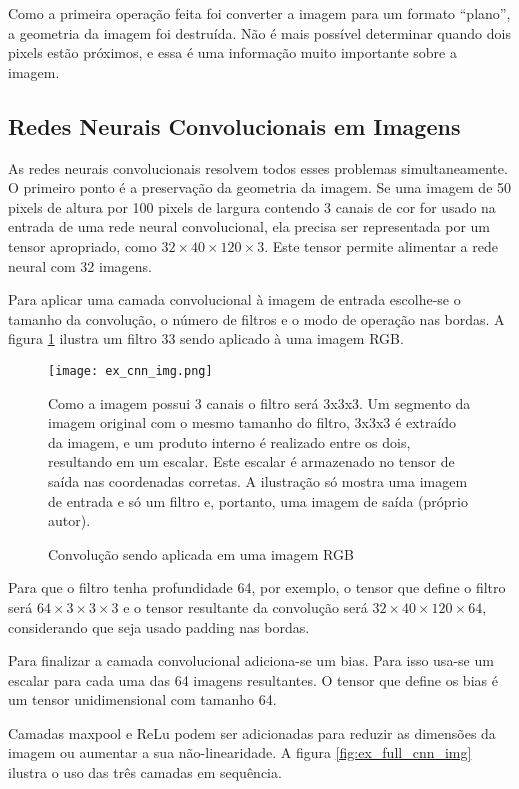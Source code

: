 Como a primeira operação feita foi converter a imagem para um formato “plano”, a
geometria da imagem foi destruída. Não é mais possível determinar quando dois
pixels estão próximos, e essa é uma informação muito importante sobre a imagem.

\subsection{Redes Neurais Convolucionais em Imagens}
As redes neurais convolucionais resolvem todos esses problemas simultaneamente.
O primeiro ponto é a preservação da geometria da imagem. Se uma imagem de 50
pixels de altura por 100 pixels de largura contendo 3 canais de cor for usado na
entrada de uma rede neural convolucional, ela precisa ser representada por um
tensor apropriado, como $32 \times 40 \times 120 \times 3$. Este tensor
permite alimentar a rede neural com 32 imagens.

Para aplicar uma camada convolucional à imagem de entrada escolhe-se o tamanho
da convolução, o número de filtros e o modo de operação nas bordas. A figura
\ref{fig:ex_cnn_img} ilustra um filtro 33 sendo aplicado à uma imagem RGB.

\begin{figure}[!htb]
	\centering
	\texttt{[image: ex\_cnn\_img.png]}
	\caption{Convolução sendo aplicada em uma imagem RGB}
	\label{fig:ex_cnn_img}
	Como a imagem possui 3 canais o filtro será 3x3x3. Um segmento da imagem
	original com o mesmo tamanho do filtro, 3x3x3 é extraído da imagem, e um
	produto interno é realizado entre os dois, resultando em um escalar. Este
	escalar é armazenado no tensor de saída nas coordenadas corretas. A
	ilustração só mostra uma imagem de entrada e só um filtro e, portanto, uma
	imagem de saída (próprio autor).
\end{figure}

Para que o filtro tenha profundidade 64, por exemplo, o tensor que define o
filtro será $64 \times 3 \times 3 \times 3$ e o tensor resultante da
convolução será $32 \times 40 \times 120 \times 64$,
considerando que seja usado padding nas bordas.

Para finalizar a camada convolucional adiciona-se um bias. Para isso usa-se um
escalar para cada uma das 64 imagens resultantes. O tensor que define os bias é
um tensor unidimensional com tamanho 64.

Camadas maxpool e ReLu podem ser adicionadas para reduzir as dimensões da imagem
ou aumentar a sua não-linearidade. A figura \ref{fig:ex_full_cnn_img}
ilustra o uso das três camadas em sequência.

